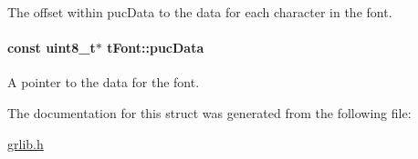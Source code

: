 The offset within puc\+Data to the data for each character in the font. 

\paragraph[{puc\+Data}]{\setlength{\rightskip}{0pt plus 5cm}const uint8\+\_\+t$\ast$ t\+Font\+::puc\+Data}\label{structt_font_a75e07a7c5ae975bc77534b2eebfb2b67}


A pointer to the data for the font. 



The documentation for this struct was generated from the following file\+:\begin{DoxyCompactItemize}
\item 
\hyperlink{grlib_8h}{grlib.\+h}\end{DoxyCompactItemize}
